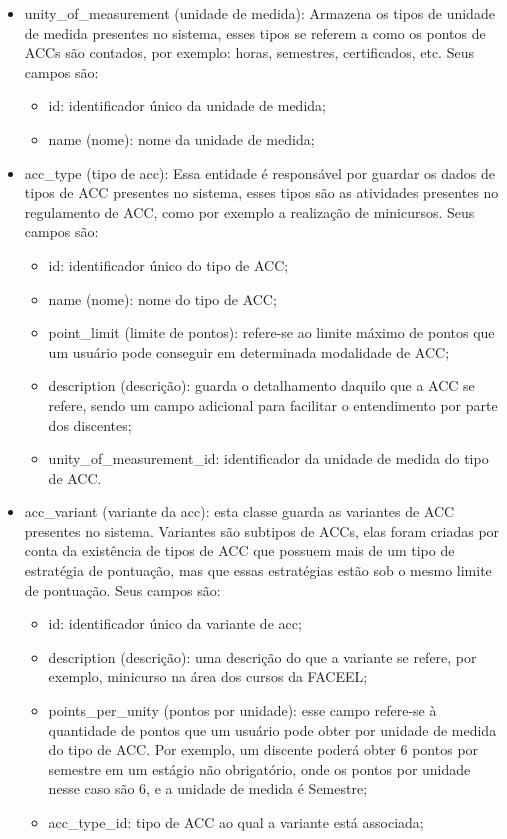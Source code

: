 \begin{itemize}
    \item unity\_of\_measurement (unidade de medida): Armazena os tipos de unidade de medida presentes no sistema, esses tipos se referem a como os pontos de ACCs são contados, por exemplo: horas, semestres, certificados, etc. Seus campos são:
    \begin{itemize}
        \item id: identificador único da unidade de medida;
        \item name (nome): nome da unidade de medida;
    \end{itemize}
    
    \item acc\_type (tipo de acc): Essa entidade é responsável por guardar os dados de tipos de ACC presentes no sistema, esses tipos são as atividades presentes no regulamento de ACC, como por exemplo a realização de minicursos. Seus campos são:
    \begin{itemize}
        \item id: identificador único do tipo de ACC;
        \item name (nome): nome do tipo de ACC;
        \item point\_limit (limite de pontos): refere-se ao limite máximo de pontos que um usuário pode conseguir em determinada modalidade de ACC;
        \item description (descrição): guarda o detalhamento daquilo que a ACC se refere, sendo um campo adicional para facilitar o entendimento por parte dos discentes;
        \item unity\_of\_measurement\_id: identificador da unidade de medida do tipo de ACC.
    \end{itemize}
    
    \item acc\_variant (variante da acc): esta classe guarda as variantes de ACC presentes no sistema. Variantes são subtipos de ACCs, elas foram criadas por conta da existência de tipos de ACC que possuem mais de um tipo de estratégia de pontuação, mas que essas estratégias estão sob o mesmo limite de pontuação. Seus campos são:
    \begin{itemize}
        \item id: identificador único da variante de acc;
        \item description (descrição): uma descrição do que a variante se refere, por exemplo, minicurso na área dos cursos da FACEEL;
        \item points\_per\_unity (pontos por unidade): esse campo refere-se à quantidade de pontos que um usuário pode obter por unidade de medida do tipo de ACC. Por exemplo, um discente poderá obter 6 pontos por semestre em um estágio não obrigatório, onde os pontos por unidade nesse caso são 6, e a unidade de medida é Semestre;
        \item acc\_type\_id: tipo de ACC ao qual a variante está associada;
    \end{itemize}
    

\end{itemize}
